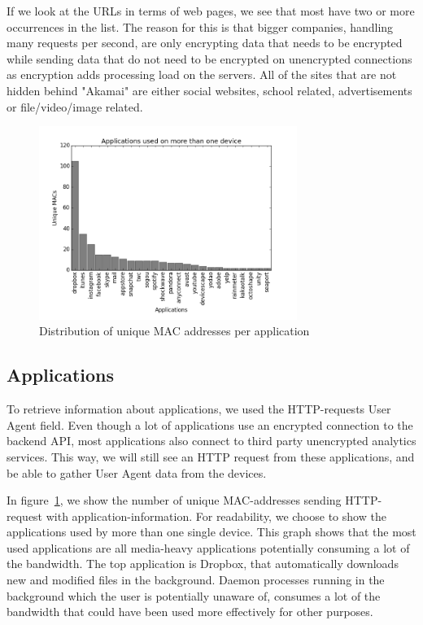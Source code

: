 \documentclass[letterpaper,twocolumn,10pt]{article}
\begin{document}
If we look at the URLs in terms of web pages, we see that most have two or more occurrences in the list. The reason for this is that bigger companies, handling many requests per second, are only encrypting data that needs to be encrypted while sending data that do not need to be encrypted on unencrypted connections as encryption adds processing load on the servers. All of the sites that are not hidden behind "Akamai" are either social websites, school related, advertisements or file/video/image related.

\begin{figure}[!htb] 
\begin{center} 
\includegraphics[width=3.3in]{applications.png} 
\caption{Distribution of unique MAC addresses per application} 
\label{fig:applications} 
\end{center}
\end{figure}

\subsection{Applications}

To retrieve information about applications, we used the HTTP-requests User Agent field. Even though a lot of applications use an encrypted connection to the backend API, most applications also connect to third party unencrypted analytics services. This way, we will still see an HTTP request from these applications, and be able to gather User Agent data from the devices.

In figure~\ref{fig:applications}, we show the number of unique MAC-addresses sending HTTP-request with application-information. For readability, we choose to show the applications used by more than one single device. This graph shows that the most used applications are all media-heavy applications potentially consuming a lot of the bandwidth. The top application is Dropbox, that automatically downloads new and modified files in the background. Daemon processes running in the background which the user is potentially unaware of, consumes a lot of the bandwidth that could have been used more effectively for other purposes.
\end{document}
